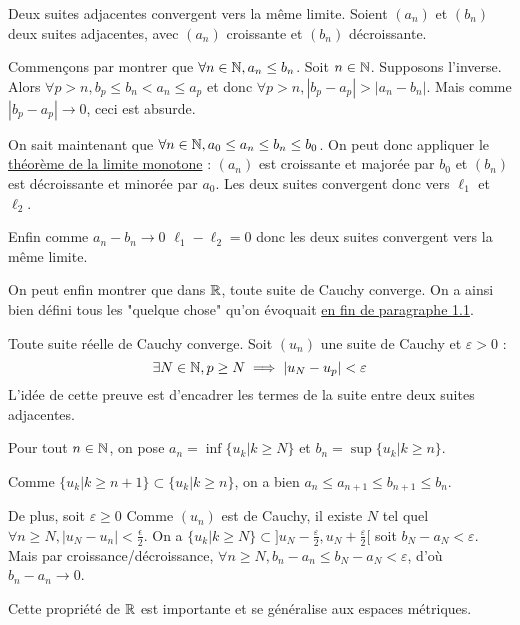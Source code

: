 \begin{theoreme}
    Deux suites adjacentes convergent vers la même limite.
    \tcblower
    Soient $(a_n)$ et $(b_n)$ deux suites adjacentes, avec $(a_n)$ croissante et $(b_n)$ décroissante.
    
    Commençons par montrer que $\forall n \in \mathbb{N}, a_n\leq b_n$. Soit $n\in \mathbb{N}$. Supposons l'inverse. Alors $\forall p > n, b_p\leq b_n<a_n\leq a_p$ et donc  $\forall p > n, |b_p-a_p|>|a_n-b_n|$. Mais comme $|b_p-a_p| \to 0$,  ceci est absurde.

    On sait maintenant que $\forall n \in \mathbb{N}, a_0 \leq a_n \leq b_n \leq b_0$. On peut donc appliquer le \hyperref[limmono]{théorème de la limite monotone} : $(a_n)$ est croissante et majorée par $b_0$ et $(b_n)$ est décroissante et minorée par $a_0$. Les deux suites convergent donc vers $\ell_1$ et $\ell_2$.

    Enfin comme $a_n-b_n \to 0$ $\ell_1-\ell_2=0$ donc les deux suites convergent vers la même limite. 
\end{theoreme}

On peut enfin montrer que dans $\mathbb{R}$, toute suite de Cauchy converge. On a ainsi bien défini tous les "quelque chose" qu'on évoquait \hyperref[motiv]{en fin de paragraphe 1.1}.

\begin{theoreme}
    Toute suite réelle de Cauchy converge.
    \tcblower
    Soit $(u_n)$ une suite de Cauchy et $\varepsilon > 0$ :
    $$\exists N \in \mathbb{N}, p \geq N \implies |u_N-u_p|<\varepsilon$$
    L'idée de cette preuve est d'encadrer les termes de la suite entre deux suites adjacentes.

    Pour tout $n\in \mathbb{N}$, on pose $a_n = \inf \{u_k|k\geq N\}$ et $b_n = \sup \{u_k|k\geq n\}$. 
    
    Comme $\{u_k|k\geq n+1\} \subset \{u_k|k\geq n\}$, on a bien $a_n \leq a_{n+1} \leq b_{n+1} \leq b_n$.

    De plus, soit $\varepsilon \geq 0$ Comme $(u_n)$ est de Cauchy, il existe $N$ tel quel $\forall n \geq N, |u_N-u_n|<\frac{\epsilon}{2}$. On a $\{u_k|k\geq N\} \subset ]u_N-\frac{\varepsilon}{2}, u_N+\frac{\varepsilon}{2}[$ soit $b_N-a_N < \varepsilon$. Mais par croissance/décroissance, $\forall n \geq N, b_n-a_n \leq b_N-a_N < \varepsilon$, d'où $b_n-a_n \to 0$. 
\end{theoreme}

Cette propriété de $\mathbb{R}$ est importante et se généralise aux espaces métriques.


